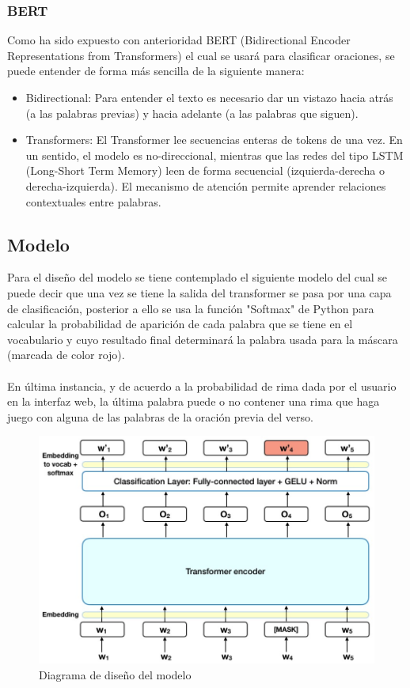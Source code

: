 \documentclass[12pt, a4paper, titlepage]{report}
\begin{document}
		\subsubsection*{BERT}
		Como ha sido expuesto con anterioridad BERT (Bidirectional Encoder Representations from Transformers) el cual se usará para clasificar oraciones, se puede entender de forma más sencilla de la siguiente manera:
		\begin{itemize}
			\item Bidirectional: Para entender el texto es necesario dar un vistazo hacia atrás (a las palabras previas) y hacia adelante (a las palabras que siguen).
			\item Transformers: El Transformer lee secuencias enteras de tokens de una vez. En un sentido, el modelo es no-direccional, mientras que las redes del tipo LSTM (Long-Short Term Memory) leen de forma secuencial (izquierda-derecha o derecha-izquierda). El mecanismo de atención permite aprender relaciones contextuales entre palabras.
		\end{itemize}
		
		\subsection{Modelo} %
		
		Para el diseño del modelo se tiene contemplado el siguiente modelo del cual se puede decir que una vez se tiene la salida del transformer se pasa por una capa de clasificación, posterior a ello se usa la función "Softmax" de Python para calcular la probabilidad de aparición de cada palabra que se tiene en el vocabulario y cuyo resultado final determinará la palabra usada para la máscara (marcada de color rojo).
		\\\\
		En última instancia, y de acuerdo a la probabilidad de rima dada por el usuario en la interfaz web, la última palabra puede o no contener una rima que haga juego con alguna de las palabras de la oración previa del verso.
		
		\begin{figure}[H]
			\includegraphics[width=12cm]{./imagenes/Disenio/Iteracion_3/bert_preoutput_model.jpg}
			\centering 
			\caption{Diagrama de diseño del modelo}
		\end{figure}
		
\end{document}
